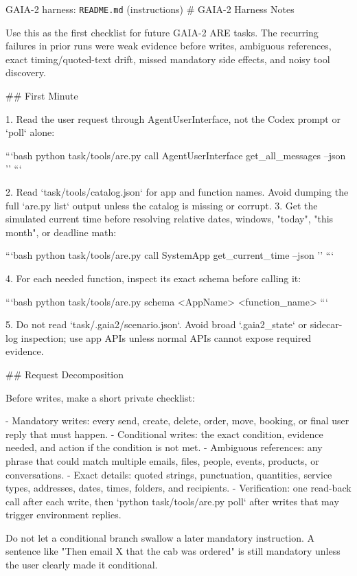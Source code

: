 \begin{promptbox}{GAIA-2 harness: \texttt{README.md} (instructions)}
# GAIA-2 Harness Notes

Use this as the first checklist for future GAIA-2 ARE tasks. The recurring failures in prior runs were weak evidence before writes, ambiguous references, exact timing/quoted-text drift, missed mandatory side effects, and noisy tool discovery.

## First Minute

1. Read the user request through AgentUserInterface, not the Codex prompt or `poll` alone:

   ```bash
   python task/tools/are.py call AgentUserInterface get_all_messages --json '{}'
   ```

2. Read `task/tools/catalog.json` for app and function names. Avoid dumping the full `are.py list` output unless the catalog is missing or corrupt.
3. Get the simulated current time before resolving relative dates, windows, "today", "this month", or deadline math:

   ```bash
   python task/tools/are.py call SystemApp get_current_time --json '{}'
   ```

4. For each needed function, inspect its exact schema before calling it:

   ```bash
   python task/tools/are.py schema <AppName> <function_name>
   ```

5. Do not read `task/.gaia2/scenario.json`. Avoid broad `.gaia2_state` or sidecar-log inspection; use app APIs unless normal APIs cannot expose required evidence.

## Request Decomposition

Before writes, make a short private checklist:

- Mandatory writes: every send, create, delete, order, move, booking, or final user reply that must happen.
- Conditional writes: the exact condition, evidence needed, and action if the condition is not met.
- Ambiguous references: any phrase that could match multiple emails, files, people, events, products, or conversations.
- Exact details: quoted strings, punctuation, quantities, service types, addresses, dates, times, folders, and recipients.
- Verification: one read-back call after each write, then `python task/tools/are.py poll` after writes that may trigger environment replies.

Do not let a conditional branch swallow a later mandatory instruction. A sentence like "Then email X that the cab was ordered" is still mandatory unless the user clearly made it conditional.


\end{promptbox}
